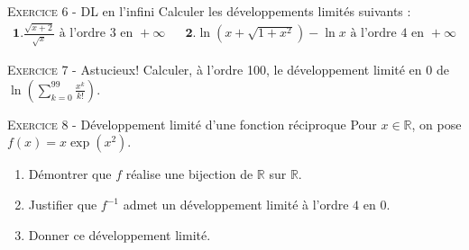 \documentclass[11pt]{article}
\begin{document}


\vskip0.3cm\noindent\textsc{Exercice 6} - DL en l'infini
\vskip0.2cm
Calculer les développements limités suivants :
$$\begin{array}{lcl}
\mathbf 1. \frac{\sqrt{x+2}}{\sqrt x}\textrm{ à l'ordre 3 en }+\infty&&
\displaystyle \mathbf 2. \ln\left(x+\sqrt {1+x^2}\right)-\ln x\textrm{ à l'ordre 4 en }+\infty
\end{array}$$




\vskip0.3cm\noindent\textsc{Exercice 7} - Astucieux!
\vskip0.2cm
Calculer, à l'ordre 100, le développement limité en 0 de $\ln\left(\sum_{k=0}^{99}\frac{x^k}{k!}\right)$.




\vskip0.3cm\noindent\textsc{Exercice 8} - Développement limité d'une fonction réciproque
\vskip0.2cm
Pour $x\in\mathbb R$, on pose $f(x)=x\exp(x^2)$.
\begin{enumerate}
\item Démontrer que $f$ réalise une bijection de $\mathbb R$ sur $\mathbb R$.
\item Justifier que $f^{-1}$ admet un développement limité à l'ordre $4$ en $0$.
\item Donner ce développement limité.
\end{enumerate}




\vskip0.5cm

\end{document}
